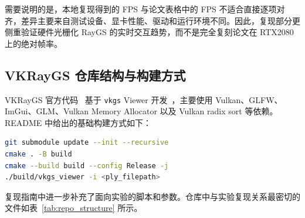 \documentclass[12pt,hyperref,a4paper,UTF8]{ctexart}
\begin{document}
需要说明的是，本地复现得到的 FPS 与论文表格中的 FPS 不适合直接逐项对齐，差异主要来自测试设备、显卡性能、驱动和运行环境不同。因此，复现部分更侧重验证硬件光栅化 RayGS 的实时交互趋势，而不是完全复刻论文在 RTX2080 上的绝对帧率。



\subsection{VKRayGS 仓库结构与构建方式}
VKRayGS 官方代码~\footnotemark{} 基于 \texttt{vkgs} Viewer 开发~\cite{vkgs}，主要使用 Vulkan、GLFW、ImGui、GLM、Vulkan Memory Allocator 以及 Vulkan radix sort 等依赖。README 中给出的基础构建方式如下：


\begin{lstlisting}[language=bash]
git submodule update --init --recursive
cmake . -B build
cmake --build build --config Release -j
./build/vkgs_viewer -i <ply_filepath>
\end{lstlisting}

复现指南中进一步补充了面向实验的脚本和参数。仓库中与实验复现关系最密切的文件如表~\ref{tab:repo_structure} 所示。
\end{document}
